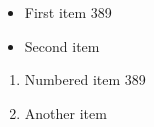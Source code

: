 \documentclass{article}
\begin{document}
\begin{itemize}
\item First item 389
\item Second item
\end{itemize}
\begin{enumerate}
\item Numbered item 389
\item Another item
\end{enumerate}
\end{document}

